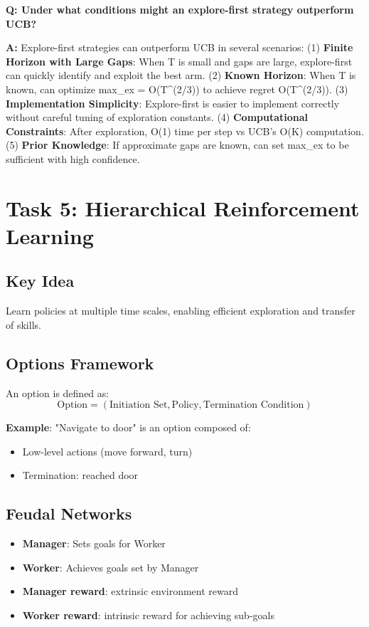 \documentclass[12pt]{article}
\begin{document}
{{{\textbf{Q: Under what conditions might an explore-first strategy outperform UCB?}

\textbf{A:} Explore-first strategies can outperform UCB in several scenarios: (1) \textbf{Finite Horizon with Large Gaps}: When T is small and gaps are large, explore-first can quickly identify and exploit the best arm. (2) \textbf{Known Horizon}: When T is known, can optimize max_ex = O(T^(2/3)) to achieve regret O(T^(2/3)). (3) \textbf{Implementation Simplicity}: Explore-first is easier to implement correctly without careful tuning of exploration constants. (4) \textbf{Computational Constraints}: After exploration, O(1) time per step vs UCB's O(K) computation. (5) \textbf{Prior Knowledge}: If approximate gaps are known, can set max_ex to be sufficient with high confidence.

\section{Task 5: Hierarchical Reinforcement Learning}

\subsection{Key Idea}

Learn policies at multiple time scales, enabling efficient exploration and transfer of skills.

\subsection{Options Framework}

An option is defined as:
\begin{equation}
\text{Option} = (\text{Initiation Set}, \text{Policy}, \text{Termination Condition})
\end{equation}

\textbf{Example}: "Navigate to door" is an option composed of:
\begin{itemize}
\item Low-level actions (move forward, turn)
\item Termination: reached door
\end{itemize}

\subsection{Feudal Networks}

\begin{itemize}
\item \textbf{Manager}: Sets goals for Worker
\item \textbf{Worker}: Achieves goals set by Manager
\item \textbf{Manager reward}: extrinsic environment reward
\item \textbf{Worker reward}: intrinsic reward for achieving sub-goals
\end{itemize}

}}}
\end{document}

